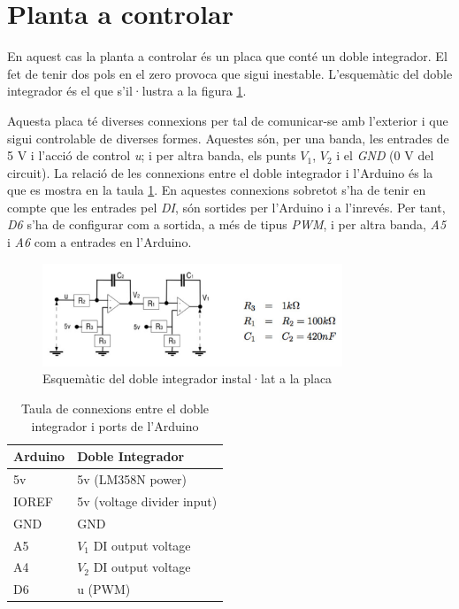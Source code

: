 \documentclass[12pt,a4paper,final,twoside,openright]{report}
\begin{document}
\section{Planta a controlar}

En aquest cas la planta a controlar és un placa que conté un doble integrador. El fet de tenir dos pols en el zero provoca que sigui inestable. L'esquemàtic del doble integrador és el que s'il·lustra a la figura \ref{fig:doble_int_scheme}.

 Aquesta placa té diverses connexions per tal de comunicar-se amb l'exterior i que sigui controlable de diverses formes. Aquestes són, per una banda, les entrades de 5 V i l'acció de control \textit{u}; i per altra banda, els punts $V_1$, $V_2$ i el \textit{GND} (0 V del circuit). La relació de les connexions entre el doble integrador i l'Arduino és la que es mostra en la taula \ref{tab:con_DI_Ard}. En aquestes connexions sobretot s'ha de tenir en compte que les entrades pel \textit{DI}, són sortides per l'Arduino i a l'inrevés. Per tant, \textit{D6} s'ha de configurar com a sortida, a més de tipus \textit{PWM}, i per altra banda, \textit{A5} i \textit{A6} com a entrades en l'Arduino.

\begin{figure}[ht]
\centering
\includegraphics[width=0.8\textwidth]{Imatges/circuit_scheme.png}
\caption{Esquemàtic del doble integrador instal·lat a la placa \label{fig:doble_int_scheme}}
\end{figure}

\begin{table}[ht]
\begin{center}
\begin{tabular}{l|l}
Arduino & Doble Integrador\\
\hline
5v & 5v (LM358N power)\\
IOREF & 5v (voltage divider input)\\
GND & GND\\
A5 & $V_1$ DI output voltage\\
A4 & $V_2$ DI output voltage\\
D6 & u (PWM)
\end{tabular}
\caption{Taula de connexions entre el doble integrador i ports de l'Arduino \label{tab:con_DI_Ard}}
\end{center}
\end{table}
\end{document}
